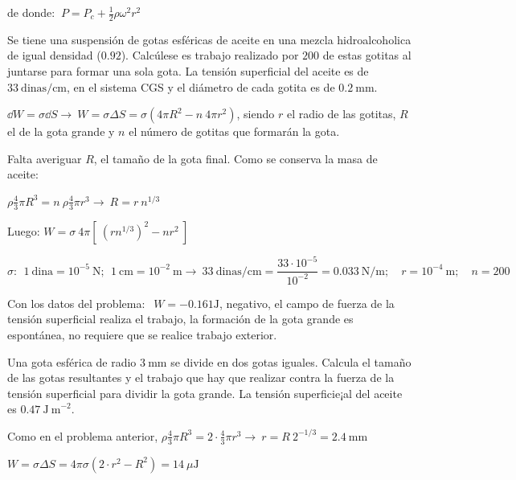 de donde: $\ P=P_c+\frac 1 2 \rho \omega^2 r^2$ 

\begin{prob}
Se tiene una suspensión de gotas esféricas de aceite en una mezcla hidroalcoholica de igual densidad ($0.92$). Calcúlese es trabajo realizado por $200$ de estas gotitas al juntarse para formar una sola gota. La tensión superficial del aceite es de $33 \ \mathrm{dinas/cm}$, en el sistema CGS y el diámetro de cada gotita es de $0.2\ \mathrm{mm}$.
\end{prob}

$\dd W = \sigma \dd S \to \ W=\sigma \Delta S=\sigma (4\pi R^2 -n\  4\pi r^2)$, siendo $r$ el radio de las gotitas, $R$ el de la gota grande y $n$ el número de gotitas que formarán la gota.

Falta averiguar $R$, el tamaño de la gota final. Como se conserva la masa de aceite:

$\rho \frac 4 3 \pi R^3= n\ \rho \frac 4 3 \pi r^3 \to \ R=r\ n^{1/3}$

Luego: $W=\sigma \ 4\pi [\ (rn^{1/3})^2-nr^2 \ ]$

$\sigma:\ \ 1 \ \mathrm{dina}=10^{-5}\ \mathrm{N};\ \ 1\ \mathrm{cm} = 10^{-2}\ \mathrm{m} \to \ 33 \ \mathrm{dinas/cm} = \dfrac {33\cdot 10^{-5}}{10^{-2}}=0.033 \ \mathrm{N/m}; \quad r=10^{-4} \ \mathrm{m}; \quad n=200$

Con los datos del problema: $\ \ W=-0.161 \mathrm{J}$, negativo, el campo de fuerza de la tensión superficial realiza el trabajo, la formación de la gota grande es espontánea, no requiere que se realice trabajo exterior.

\begin{prob}
Una gota esférica de radio $3\ \mathrm{mm}$ se divide en dos gotas iguales. Calcula el tamaño de las gotas resultantes y el trabajo que hay que realizar contra la fuerza de la tensión superficial	para dividir la gota grande. La tensión superficie¡al del aceite es $0.47\ \mathrm{J\ m}^{-2}$.
\end{prob}

Como en el problema anterior, $\rho \frac 4 3 \pi R^3 = 2\cdot \frac 4 3 \pi r^3 \to \ r=R\ 2^{-1/3}=2.4\ \mathrm{mm}$

$W=\sigma \Delta S = 4 \pi \sigma (2\cdot r^2-R^2)=14\ \mu \mathrm{J}$


